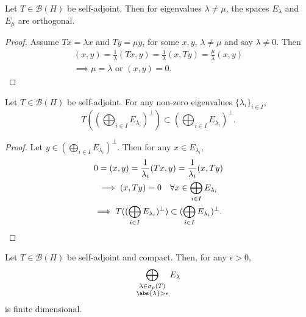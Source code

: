 \documentclass{article}
\begin{document}
\begin{lemma}
    Let $T \in \mathcal{B}(H)$ be self-adjoint.
    Then for eigenvalues $\lambda \neq \mu$, the spaces $E_\lambda$ and $E_\mu$ are orthogonal.
\end{lemma}

\begin{proof}
    Assume $T x = \lambda x$ and $T y = \mu y$, for some $x,y$, $\lambda \neq \mu$ and say $\lambda \neq 0$.
    Then
    \begin{gather*}
        (x,y) = \frac{1}{\lambda} (T x,y) = \frac{1}{\lambda} (x, T y) = \frac{\mu}{\lambda} (x,y) \\
        \implies \mu = \lambda \text{ or } (x, y) = 0.
    \end{gather*}
\end{proof}

\begin{lemma}
    Let $T \in \mathcal{B}(H)$ be self-adjoint. For any non-zero eigenvalues $\{\lambda_i\}_{i \in I}$,
    \begin{equation*}
        T((\bigoplus_{i \in I} E_{\lambda_i})^\perp) \subset (\bigoplus_{i \in I} E_{\lambda_i})^\perp.
    \end{equation*}
\end{lemma}

\begin{proof}
    Let $y \in (\bigoplus_{i \in I} E_{\lambda_i})^\perp$. Then for any $x \in E_{\lambda_i}$,
    \begin{gather*}
        0 = (x,y) = \frac{1}{\lambda_i} (T x, y) = \frac{1}{\lambda_i} (x, T y) \\
        \implies (x, T y) = 0 \quad \forall x \in \bigoplus_{i \in I} E_{\lambda_i} \\
        \implies T((\bigoplus_{i \in I} E_{\lambda_i})^\perp) \subset (\bigoplus_{i \in I} E_{\lambda_i})^\perp. \qedhere
    \end{gather*}
\end{proof}

\begin{lemma}
    Let $T \in \mathcal{B}(H)$ be self-adjoint and compact.
    Then, for any $\epsilon > 0$,
    \begin{equation*}
        \bigoplus_{\substack{\lambda \in \sigma_p(T) \\ \abs{\lambda} > \epsilon}} E_\lambda
    \end{equation*}
    is finite dimensional.
\end{lemma}
\end{document}
